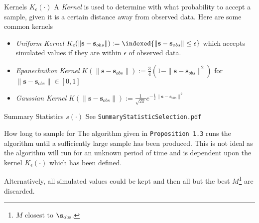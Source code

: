 \documentclass[11pt,a4paper]{article}
\begin{document}
\begin{proposition}{Kernels $K_\epsilon(\cdot)$}
  A \textit{Kernel} is used to determine with what probability to accept a sample, given it is a certain distance away from observed data. Here are some common kernels
  \begin{itemize}
    \item \textit{Uniform Kernel} $K_\epsilon(\|\mathbf{s}-\mathbf{s}_{obs}\|):=\indexed\{\|\mathbf{s}-\mathbf{s}_{obs}\|\leq\epsilon\}$ which accepts simulated values if they are within $\epsilon$ of observed data.
    \item \textit{Epanechnikov Kernel} $K(\|\mathbf{s}-\mathbf{s}_{obs}\|):=\frac34(1-\|\mathbf{s}-\mathbf{s}_{obs}\|^2)$ for $\|\mathbf{s}-\mathbf{s}_{obs}\|\in[0,1]$
    \item \textit{Gaussian Kernel} $K(\|\mathbf{s}-\mathbf{s}_{obs}\|):=\frac1{\sqrt{2\pi}}e^{-\frac12\|\mathbf{s}-\mathbf{s}_{obs}\|^2}$
  \end{itemize}
\end{proposition}

\begin{proposition}{Summary Statistics $s(\cdot)$}
  See \texttt{SummaryStatisticSelection.pdf}
\end{proposition}

\begin{proposition}{How long to sample for}
  The algorithm given in \texttt{Proposition 1.3} runs the algorithm until a sufficiently large sample has been produced. This is not ideal as the algorithm will run for an unknown period of time and is dependent upon the kernel $K_\epsilon(\cdot)$ which has been defined.
  \par Alternatively, all simulated values could be kept and then all but the best $M$\footnote{$M$ closest to $\s_\text{obs}$.} are discarded.
\end{proposition}
\end{document}
